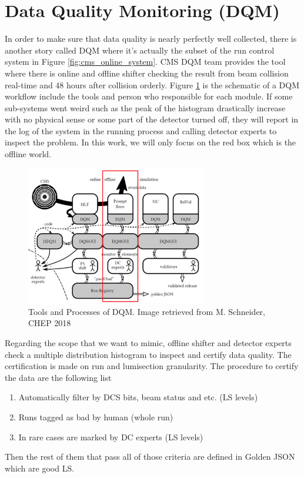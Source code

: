 
\section{Data Quality Monitoring (DQM)}

In order to make sure that data quality is nearly perfectly well collected, there is another story called DQM where it's actually the subset of the run control system in Figure \ref{fig:cms_online_system}.
CMS DQM team provides the tool where there is online and offline shifter checking the result from beam collision real-time and 48 hours after collision orderly. Figure \ref{fig:dqm_flow} is the schematic of a DQM workflow include the tools and person who responsible for each module.
If some sub-systems went weird such as the peak of the histogram drastically increase with no physical sense or some part of the detector turned off, they will report in the log of the system in the running process and calling detector experts to inspect the problem.
In this work, we will only focus on the red box which is the offline world.

\begin{figure}[h!]
    \centering
    \includegraphics[width=0.7\textwidth]{images/dqm_flow.png}
    \caption{Tools and Processes of DQM. Image retrieved from M. Schneider, CHEP 2018}
    \label{fig:dqm_flow}
\end{figure}

Regarding the scope that we want to mimic, offline shifter and detector experts check a multiple distribution histogram to inspect and certify data quality.
The certification is made on run and lumisection granularity. The procedure to certify the data are the following list
\begin{enumerate}
    \item Automatically filter by DCS bits, beam status and etc. (LS levels)
    \item Runs tagged as bad by human (whole run)
    \item In rare cases are marked by DC experts (LS levels)
\end{enumerate}
Then the rest of them that pass all of those criteria are defined in Golden JSON which are good LS.
